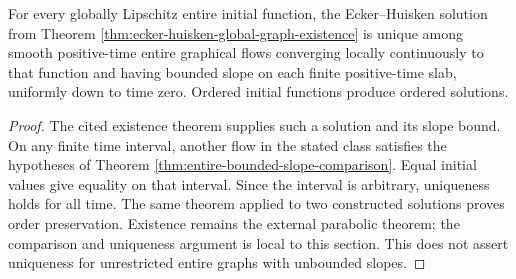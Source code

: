 \begin{corollary}\label{cor:globally-lipschitz-graph-wellposedness}
For every globally Lipschitz entire initial function, the Ecker--Huisken solution from Theorem \ref{thm:ecker-huisken-global-graph-existence} is unique among smooth positive-time entire graphical flows converging locally continuously to that function and having bounded slope on each finite positive-time slab, uniformly down to time zero. Ordered initial functions produce ordered solutions.
\end{corollary}
\begin{proof}
The cited existence theorem supplies such a solution and its slope bound. On any finite time interval, another flow in the stated class satisfies the hypotheses of Theorem \ref{thm:entire-bounded-slope-comparison}. Equal initial values give equality on that interval. Since the interval is arbitrary, uniqueness holds for all time. The same theorem applied to two constructed solutions proves order preservation. Existence remains the external parabolic theorem; the comparison and uniqueness argument is local to this section. This does not assert uniqueness for unrestricted entire graphs with unbounded slopes.
\end{proof}

